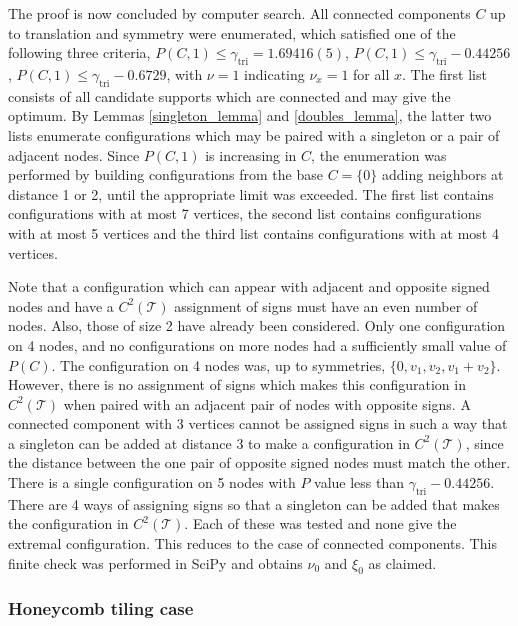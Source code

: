 \documentclass[a4paper, 12pt, notitlepage]{amsart}
\newcommand{\tri}{\operatorname{tri}}
\newcommand{\sT}{\mathscr{T}}
\theoremstyle{remark}
\begin{document}
The proof is now concluded by computer search.  All connected components $C$ up to translation and symmetry were enumerated, which satisfied one of the following three criteria, $P(C, 1) \leq \gamma_{\tri} = 1.69416(5)$, $P(C, 1) \leq \gamma_{\tri} - 0.44256$, $P(C, 1) \leq \gamma_{\tri} - 0.6729$, with $\nu = 1$ indicating $\nu_x = 1$ for all $x$. The first list consists of all candidate supports which are connected and may give the optimum. By Lemmas \ref{singleton_lemma} and \ref{doubles_lemma}, the latter two lists enumerate configurations which may be paired with a singleton or a pair of adjacent nodes. Since $P(C, 1)$ is increasing in $C$, the enumeration was performed by building configurations from the base $C = \{0\}$ adding neighbors at distance 1 or 2, until the appropriate limit was exceeded.  The first list contains configurations with at most 7 vertices, the second list contains configurations with at most 5 vertices and the third list contains configurations with at most 4 vertices.

Note that a configuration which can appear with adjacent and opposite signed nodes and have a $C^2(\sT)$ assignment of signs must have an even number of nodes.  Also, those of size 2 have already been considered.  Only one configuration on 4 nodes, and no configurations on more nodes had a sufficiently small value of $P(C)$.  The configuration on 4 nodes was, up to symmetries, $\{0, v_1, v_2, v_1 + v_2\}$.  However, there is no assignment of signs which makes this configuration in $C^2(\sT)$ when paired with an adjacent pair of nodes with opposite signs. A connected component with 3 vertices cannot be assigned signs in such a way that a singleton can be added at distance 3 to make a configuration in $C^2(\sT)$, since the distance between the one pair of opposite signed nodes must match the other.  There is a single configuration on 5 nodes with $P$ value less than $\gamma_{\tri} - 0.44256$. There are 4 ways of assigning signs so that a singleton can be added that makes the configuration in $C^2(\sT)$.  Each of these was tested and none give the extremal configuration.  This reduces to the case of connected components.  This finite check was performed in SciPy and obtains $\nu_0$ and $\xi_0$ as claimed.






\subsubsection{Honeycomb tiling case}\label{honeycomb_section}
\end{document}
